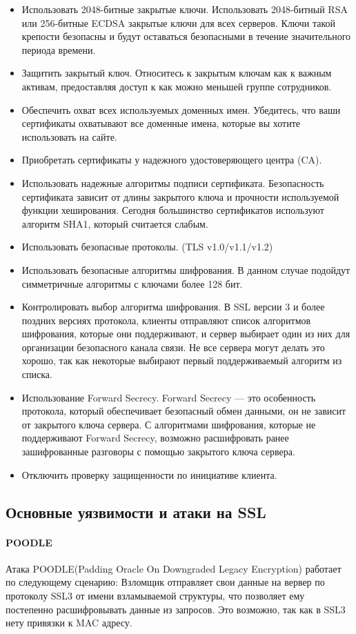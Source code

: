 \documentclass[10pt,a4paper]{report}
\begin{document}
\begin{itemize}
	\item Использовать 2048-битные закрытые ключи.
	Использовать 2048-битный RSA или 256-битные ECDSA закрытые ключи для всех серверов. Ключи такой крепости безопасны и будут оставаться безопасными в течение значительного периода времени.
	\item Защитить закрытый ключ. Относитесь к закрытым ключам как к важным активам, предоставляя доступ к как можно меньшей группе сотрудников.
	\item Обеспечить охват всех используемых доменных имен. Убедитесь, что ваши сертификаты охватывают все доменные имена, которые вы хотите использовать на сайте.
	\item Приобретать сертификаты у надежного удостоверяющего центра (CA).
	\item Использовать надежные алгоритмы подписи сертификата. Безопасность сертификата зависит от длины закрытого ключа и прочности используемой функции хеширования. Сегодня большинство сертификатов используют алгоритм SHA1, который считается слабым. 
	\item Использовать безопасные протоколы. (TLS v1.0/v1.1/v1.2)
	\item Использовать безопасные алгоритмы шифрования. В данном случае подойдут симметричные алгоритмы с ключами более 128 бит.
	\item Контролировать выбор алгоритма шифрования. В SSL версии 3 и более поздних версиях протокола, клиенты отправляют список алгоритмов шифрования, которые они поддерживают, и сервер выбирает один из них для организации безопасного канала связи. Не все сервера могут делать это хорошо, так как некоторые выбирают первый поддерживаемый алгоритм из списка.
	\item Использование Forward Secrecy. Forward Secrecy — это особенность протокола, который обеспечивает безопасный обмен данными, он не зависит от закрытого ключа сервера. С алгоритмами шифрования, которые не поддерживают Forward Secrecy, возможно расшифровать ранее зашифрованные разговоры с помощью закрытого ключа сервера.
	\item Отключить проверку защищенности по инициативе клиента.
\end{itemize}

\subsection{Основные уязвимости и атаки на SSL}

\paragraph {POODLE\\}
Атака POODLE(Padding Oracle On Downgraded Legacy Encryption) работает по следующему сценарию: Взломщик отправляет свои данные на вервер по протоколу SSL3 от имени взламываемой структуры, что позволяет ему постепенно расшифровывать данные из запросов. Это возможно, так как в SSL3 нету привязки к MAC адресу.
\end{document}
